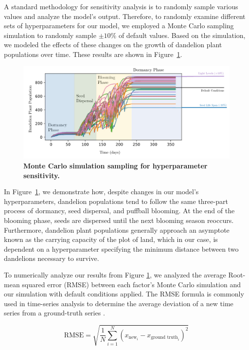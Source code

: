 A standard methodology for sensitivity analysis is to randomly sample various values and analyze the model's output. Therefore, to randomly examine different sets of hyperparameters for our model, we employed a Monte Carlo sampling simulation to randomly sample \(\pm 10\%\) of default values. Based on the simulation, we modeled the effects of these changes on the growth of dandelion plant populations over time. These results are shown in Figure~\ref{fig:sensitivitypopulation}.

\begin{figure}[h!]
\centering
    \includegraphics[scale=0.7]{figures/sensitivitypopulation.pdf}
    \captionsetup{width=0.9\textwidth}
    \caption{\textbf{Monte Carlo simulation sampling for hyperparameter sensitivity.}}
    \label{fig:sensitivitypopulation}
\end{figure}

In Figure~\ref{fig:sensitivitypopulation}, we demonstrate how, despite changes in our model's hyperparameters, dandelion populations tend to follow the same three-part process of dormancy, seed dispersal, and puffball blooming. At the end of the blooming phase, seeds are dispersed until the next blooming season reoccurs. Furthermore, dandelion plant populations generally approach an asymptote known as the carrying capacity of the plot of land, which in our case, is dependent on a hyperparameter specifying the minimum distance between two dandelions necessary to survive.

To numerically analyze our results from Figure \ref{fig:sensitivitypopulation}, we analyzed the average Root-mean squared error (RMSE) between each factor's Monte Carlo simulation and our simulation with default conditions applied. The RMSE formula is commonly used in time-series analysis to determine the average deviation of a new time series from a ground-truth series \cite{calzone_mae_2022}. 

\begin{equation}
    \text{RMSE} = \sqrt{\frac{1}{N}\sum\limits_{i=1}^{N} \left(x_{\text{new}_i} - x_{\text{ground truth}_i}\right)^2}
\end{equation}

